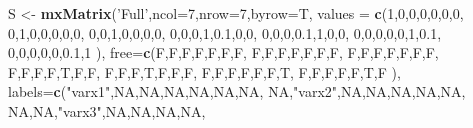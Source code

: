 \documentclass[]{article}
\newenvironment{Shaded}{\begin{snugshade}}{\end{snugshade}}
\newcommand{\KeywordTok}[1]{\textcolor[rgb]{0.13,0.29,0.53}{\textbf{#1}}}
\newcommand{\DataTypeTok}[1]{\textcolor[rgb]{0.13,0.29,0.53}{#1}}
\newcommand{\DecValTok}[1]{\textcolor[rgb]{0.00,0.00,0.81}{#1}}
\newcommand{\FloatTok}[1]{\textcolor[rgb]{0.00,0.00,0.81}{#1}}
\newcommand{\StringTok}[1]{\textcolor[rgb]{0.31,0.60,0.02}{#1}}
\newcommand{\OtherTok}[1]{\textcolor[rgb]{0.56,0.35,0.01}{#1}}
\newcommand{\NormalTok}[1]{#1}
\begin{document}
\begin{Shaded}
\begin{Highlighting}[]
\NormalTok{S <-}\StringTok{ }\KeywordTok{mxMatrix}\NormalTok{(}\StringTok{'Full'}\NormalTok{,}\DataTypeTok{ncol=}\DecValTok{7}\NormalTok{,}\DataTypeTok{nrow=}\DecValTok{7}\NormalTok{,}\DataTypeTok{byrow=}\NormalTok{T,}
              \DataTypeTok{values =} \KeywordTok{c}\NormalTok{(}\DecValTok{1}\NormalTok{,}\DecValTok{0}\NormalTok{,}\DecValTok{0}\NormalTok{,}\DecValTok{0}\NormalTok{,}\DecValTok{0}\NormalTok{,}\DecValTok{0}\NormalTok{,}\DecValTok{0}\NormalTok{,}
                         \DecValTok{0}\NormalTok{,}\DecValTok{1}\NormalTok{,}\DecValTok{0}\NormalTok{,}\DecValTok{0}\NormalTok{,}\DecValTok{0}\NormalTok{,}\DecValTok{0}\NormalTok{,}\DecValTok{0}\NormalTok{,}
                         \DecValTok{0}\NormalTok{,}\DecValTok{0}\NormalTok{,}\DecValTok{1}\NormalTok{,}\DecValTok{0}\NormalTok{,}\DecValTok{0}\NormalTok{,}\DecValTok{0}\NormalTok{,}\DecValTok{0}\NormalTok{,}
                         \DecValTok{0}\NormalTok{,}\DecValTok{0}\NormalTok{,}\DecValTok{0}\NormalTok{,}\DecValTok{1}\NormalTok{,}\FloatTok{0.1}\NormalTok{,}\DecValTok{0}\NormalTok{,}\DecValTok{0}\NormalTok{,}
                         \DecValTok{0}\NormalTok{,}\DecValTok{0}\NormalTok{,}\DecValTok{0}\NormalTok{,}\FloatTok{0.1}\NormalTok{,}\DecValTok{1}\NormalTok{,}\DecValTok{0}\NormalTok{,}\DecValTok{0}\NormalTok{,}
                         \DecValTok{0}\NormalTok{,}\DecValTok{0}\NormalTok{,}\DecValTok{0}\NormalTok{,}\DecValTok{0}\NormalTok{,}\DecValTok{0}\NormalTok{,}\DecValTok{1}\NormalTok{,}\FloatTok{0.1}\NormalTok{,}
                         \DecValTok{0}\NormalTok{,}\DecValTok{0}\NormalTok{,}\DecValTok{0}\NormalTok{,}\DecValTok{0}\NormalTok{,}\DecValTok{0}\NormalTok{,}\FloatTok{0.1}\NormalTok{,}\DecValTok{1}
\NormalTok{              ),}
              \DataTypeTok{free=}\KeywordTok{c}\NormalTok{(F,F,F,F,F,F,F,}
\NormalTok{                     F,F,F,F,F,F,F,}
\NormalTok{                     F,F,F,F,F,F,F,}
\NormalTok{                     F,F,F,F,T,F,F,}
\NormalTok{                     F,F,F,T,F,F,F,}
\NormalTok{                     F,F,F,F,F,F,T,}
\NormalTok{                     F,F,F,F,F,T,F}
\NormalTok{              ),}
              \DataTypeTok{labels=}\KeywordTok{c}\NormalTok{(}\StringTok{"varx1"}\NormalTok{,}\OtherTok{NA}\NormalTok{,}\OtherTok{NA}\NormalTok{,}\OtherTok{NA}\NormalTok{,}\OtherTok{NA}\NormalTok{,}\OtherTok{NA}\NormalTok{,}\OtherTok{NA}\NormalTok{,}
                       \OtherTok{NA}\NormalTok{,}\StringTok{"varx2"}\NormalTok{,}\OtherTok{NA}\NormalTok{,}\OtherTok{NA}\NormalTok{,}\OtherTok{NA}\NormalTok{,}\OtherTok{NA}\NormalTok{,}\OtherTok{NA}\NormalTok{,}
                       \OtherTok{NA}\NormalTok{,}\OtherTok{NA}\NormalTok{,}\StringTok{"varx3"}\NormalTok{,}\OtherTok{NA}\NormalTok{,}\OtherTok{NA}\NormalTok{,}\OtherTok{NA}\NormalTok{,}\OtherTok{NA}\NormalTok{,}

\end{Highlighting}
\end{Shaded}
\end{document}
